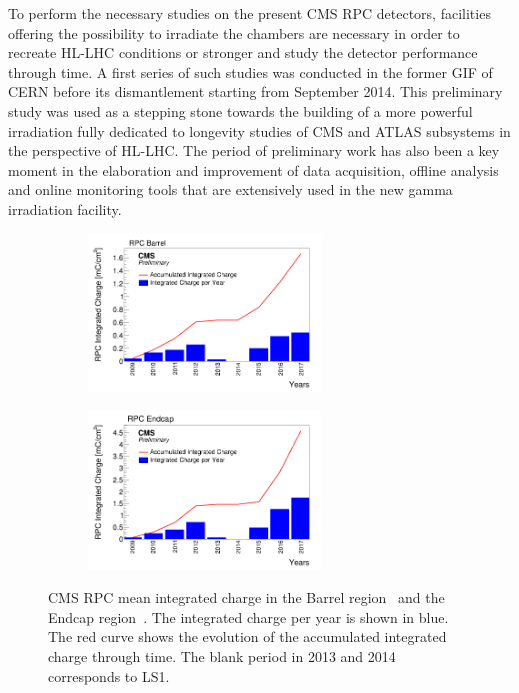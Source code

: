 \endgroup
	
	To perform the necessary studies on the present CMS RPC detectors, facilities offering the possibility to irradiate the chambers are necessary in order to recreate HL-LHC conditions or stronger and study the detector performance through time. A first series of such studies was conducted in the former \acf{GIF} of CERN before its dismantlement starting from September 2014. This preliminary study was used as a stepping stone towards the building of a more powerful irradiation fully dedicated to longevity studies of CMS and ATLAS subsystems in the perspective of HL-LHC. The period of preliminary work has also been a key moment in the elaboration and improvement of data acquisition, offline analysis and online monitoring tools that are extensively used in the new gamma irradiation facility.
    
	\begin{figure}[H]
		\begin{subfigure}{0.5\linewidth}
			\centering
			\includegraphics[height=42mm]{fig/chapt5/Mean-Int-charge-Barrel.png}
			\caption{\label{fig:Mean-Int-Charge:A}}
		\end{subfigure}
		\begin{subfigure}{0.5\linewidth}
			\centering
			\includegraphics[height=42mm]{fig/chapt5/Mean-Int-charge-Endcap.png}
			\caption{\label{fig:Mean-Int-Charge:B}}
		\end{subfigure}
		\caption{\label{fig:Mean-Int-Charge} CMS RPC mean integrated charge in the Barrel region~ and the Endcap region~. The integrated charge per year is shown in blue. The red curve shows the evolution of the accumulated integrated charge through time. The blank period in 2013 and 2014 corresponds to LS1.}
	\end{figure}
	
